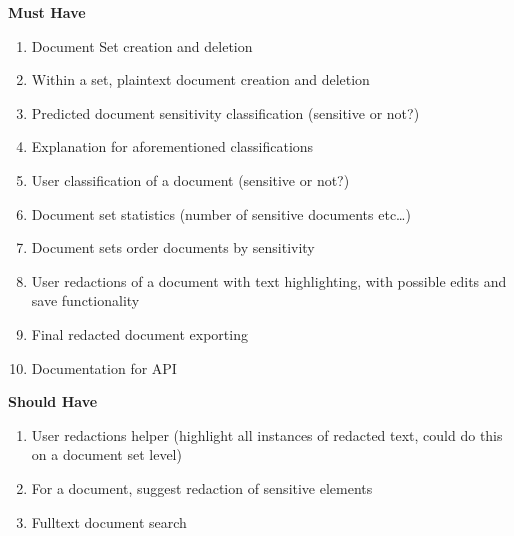 \documentclass[\version]{l4proj}
\begin{document}
\begin{adjustbox}{width=\textwidth,center}
    \begin{minipage}[t]{.5\linewidth}
        \centerline{\textbf{Must Have}}
        \begin{enumerate}[label=\textbf{M\arabic*}]
            \item Document Set creation and deletion
            \item Within a set, plaintext document creation and deletion
            \item Predicted document sensitivity classification (sensitive or not?)
            \item Explanation for aforementioned classifications
            \item User classification of a document (sensitive or not?)
            \item Document set statistics (number of sensitive documents etc\ldots)
            \item Document sets order documents by sensitivity
            \item User redactions of a document with text highlighting, with possible edits and save functionality
            \item Final redacted document exporting
            \item Documentation for API
        \end{enumerate}
    \end{minipage}
    \hfill
    \noindent
    \begin{minipage}[t]{.5\linewidth}
        \centerline{\textbf{Should Have}}
        \begin{enumerate}[label=\textbf{S\arabic*}]
            \item User redactions helper (highlight all instances of redacted text, could do this on a document set level)
            \item For a document, suggest redaction of sensitive elements
            \item Fulltext document search
        \end{enumerate}
    \end{minipage}
\end{adjustbox}

\vspace{0.5cm}
\end{document}
